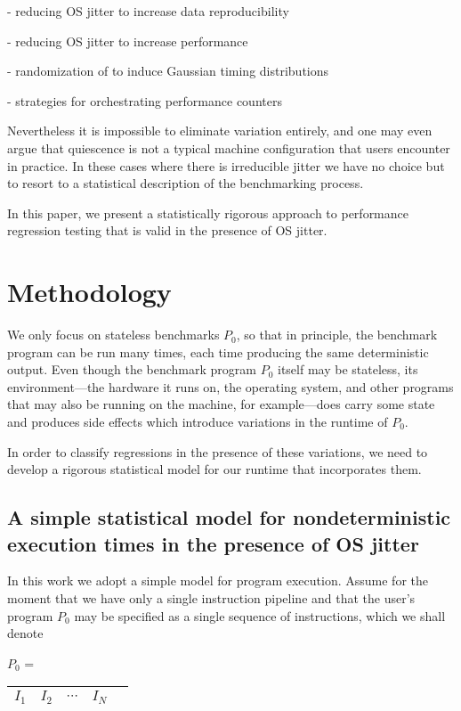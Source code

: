 \documentclass[conference]{IEEEtran}
\begin{document}
- reducing OS jitter to increase data reproducibility

- reducing OS jitter to increase performance

- randomization of  to induce Gaussian timing distributions

- strategies for orchestrating performance counters

Nevertheless it is impossible to eliminate variation
entirely, and one may even argue that quiescence is not a typical machine
configuration that users encounter in practice.
In these cases where there is irreducible jitter we have no choice but to resort to a statistical description of the benchmarking process.

In this paper, we present a statistically rigorous approach to performance regression
testing that is valid in the presence of OS jitter.




\section{Methodology}

We only focus on stateless benchmarks $P_0$, so that in principle, the benchmark program can be run many times, each time producing the same deterministic output. Even though the benchmark program $P_0$ itself may be stateless, its environment---the hardware it runs on, the operating system, and other programs that may also be running on the machine, for example---does carry some state and produces side effects which introduce variations in the runtime of $P_0$.

In order to classify regressions in the presence of these variations, we need to develop a rigorous statistical model for our runtime that incorporates them.

\label{sec:statmodel}
\subsection{A simple statistical model for nondeterministic execution times in the presence of OS jitter}

In this work we adopt a simple model for program execution. Assume for the moment that we have only a single instruction pipeline and that the user's program $P_0$ may be specified as a single sequence of instructions, which we shall denote

$P_0$ = \begin{tabular}{|c|c|c|c|c|}
\hline
$I_1$ & $I_2$ & $\cdots$ & $I_N$ \tabularnewline
\hline
\end{tabular}
\end{document}
